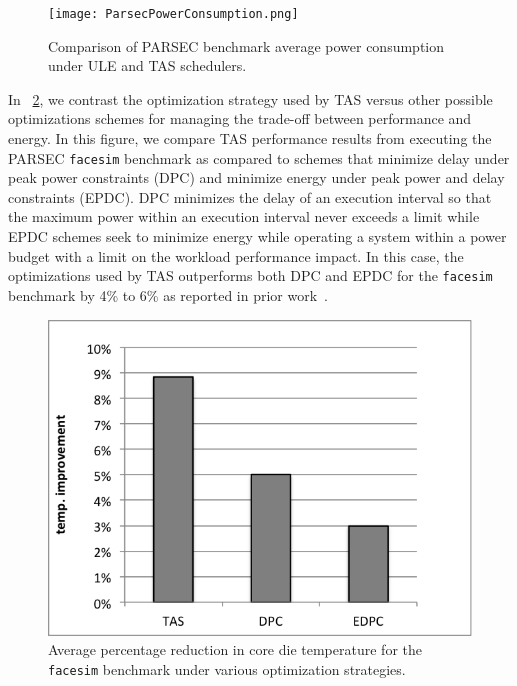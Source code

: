 \documentclass[times, 10pt,twocolumn]{IEEEtran}
\begin{document}
\begin{figure}[!tbp]
  \texttt{[image: ParsecPowerConsumption.png]}
  \caption{Comparison of PARSEC benchmark average power consumption under ULE and TAS schedulers.}
  \label{fig:pbenchmark}
\end{figure}
In \figurename~\ref{fig:tasvsedp}, we contrast the optimization strategy
used by TAS versus other possible optimizations schemes for managing the
trade-off between performance and energy.  In this figure, we compare
TAS performance results from executing the PARSEC
\texttt{facesim} benchmark as compared to schemes that minimize delay
under peak power constraints (DPC) and minimize energy under peak power and
delay constraints (EPDC). DPC minimizes the delay of an execution
interval so that the maximum power within an execution interval never
exceeds a limit while EPDC schemes seek to minimize energy while
operating a system within a power budget with a limit on the workload
performance impact. In this case, the optimizations used by TAS
outperforms both DPC and EPDC for the \texttt{facesim} 
benchmark by 4\% to 6\%  as reported in prior work~\cite{Cochran2011}. 

\begin{figure}[!tbhp]
  \centering
\includegraphics[scale=0.6]{graphics/tasvsedpc}
  \caption{Average percentage reduction in core die temperature for the
    \texttt{facesim} benchmark under various optimization strategies.}
  \label{fig:tasvsedp}
\end{figure}
\end{document}
